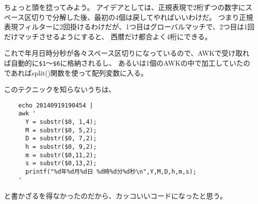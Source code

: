 ちょっと頭を捻ってみよう。
アイデアとしては、正規表現で2桁ずつの数字にスペース区切りで分解した後、最初の4個は戻してやればいいわけだ。
つまり正規表現フィルターに2回掛けるわけだが、1つ目はグローバルマッチで、2つ目は1回だけマッチさせるようにすると、
西暦だけ都合よく4桁にできる。

これで年月日時分秒が各々スペース区切りになっているので、AWKで受け取れば自動的に\verb|$1|～\verb|$6|に格納されるし、
あるいは1個のAWKの中で加工していたのであればsplit()関数を使って配列変数に入る。

このテクニックを知らないうちは、
\begin{verbatim}
	echo 20140919190454 |
	awk '
	  Y = substr($0, 1,4);
	  M = substr($0, 5,2);
	  D = substr($0, 7,2);
	  h = substr($0, 9,2);
	  m = substr($0,11,2);
	  s = substr($0,13,2);
	  printf("%d年%d月%d日 %d時%d分%d秒\n",Y,M,D,h,m,s);
	'
\end{verbatim}

\noindent
と書かざるを得なかったのだから、カッコいいコードになったと思う。
